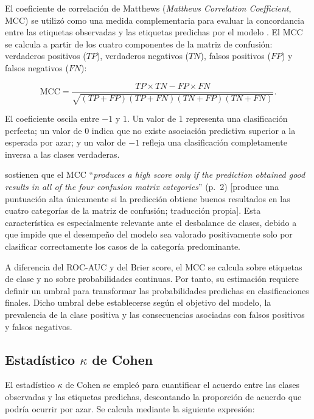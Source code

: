 El coeficiente de correlación de Matthews (\emph{Matthews Correlation Coefficient},
MCC) se utilizó como una medida complementaria para evaluar la concordancia entre
las etiquetas observadas y las etiquetas predichas por el modelo
\cite{matthews1975comparison}. El MCC se calcula a partir de los cuatro componentes
de la matriz de confusión: verdaderos positivos ($TP$), verdaderos negativos
($TN$), falsos positivos ($FP$) y falsos negativos ($FN$):

\begin{equation}
\text{MCC}=
\frac{TP \times TN-FP \times FN}
{\sqrt{(TP+FP)(TP+FN)(TN+FP)(TN+FN)}}.
\end{equation}

El coeficiente oscila entre $-1$ y $1$. Un valor de 1 representa una clasificación
perfecta; un valor de 0 indica que no existe asociación predictiva superior a la
esperada por azar; y un valor de $-1$ refleja una clasificación completamente
inversa a las clases verdaderas.

 sostienen que el MCC ``\emph{produces a high score
only if the prediction obtained good results in all of the four confusion matrix
categories}'' (p.~2) [produce una puntuación alta únicamente si la predicción
obtiene buenos resultados en las cuatro categorías de la matriz de confusión;
traducción propia]. Esta característica es especialmente relevante ante el
desbalance de clases, debido a que impide que el desempeño del modelo sea valorado
positivamente solo por clasificar correctamente los casos de la categoría
predominante.

A diferencia del ROC-AUC y del Brier score, el MCC se calcula sobre etiquetas de
clase y no sobre probabilidades continuas. Por tanto, su estimación requiere
definir un umbral para transformar las probabilidades predichas en clasificaciones
finales. Dicho umbral debe establecerse según el objetivo del modelo, la
prevalencia de la clase positiva y las consecuencias asociadas con falsos positivos
y falsos negativos.

\subsection{Estadístico \texorpdfstring{$\kappa$}{kappa} de Cohen}

El estadístico $\kappa$ de Cohen se empleó para cuantificar el acuerdo entre las
clases observadas y las etiquetas predichas, descontando la proporción de acuerdo
que podría ocurrir por azar. Se calcula mediante la siguiente expresión:

